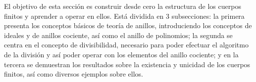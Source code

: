 El objetivo de esta sección es construir desde cero la estructura de los cuerpos finitos y aprender a operar en ellos. Está dividida en 3 subsecciones: la primera presenta los conceptos básicos de teoría de anillos, introduciendo los conceptos de ideales y de anillos cociente, así como el anillo de polinomios; la segunda se centra en el concepto de divisibilidad, necesario para poder efectuar el algoritmo de la división y así poder operar con los elementos del anillo cociente; y en la tercera se demuestran los resultados sobre la existencia y unicidad de los cuerpos finitos, así como diversos ejemplos sobre ellos.
